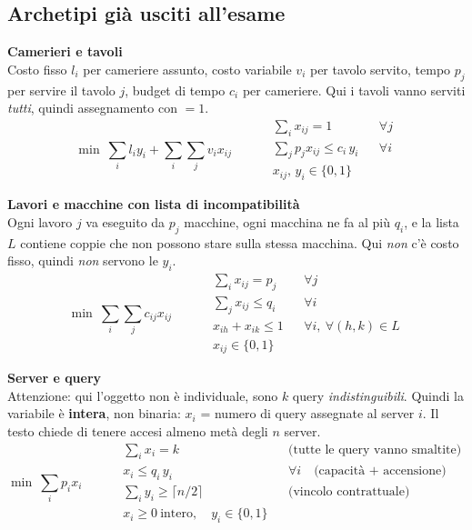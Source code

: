 \documentclass[11pt,a4paper]{article}
\begin{document}
\newpage
\subsection{Archetipi già usciti all'esame}

\textbf{Camerieri e tavoli} \\
Costo fisso $l_i$ per cameriere assunto, costo variabile $v_i$ per tavolo servito, tempo $p_j$
per servire il tavolo $j$, budget di tempo $c_i$ per cameriere. Qui i tavoli vanno serviti
\emph{tutti}, quindi assegnamento con $=1$.
\[
\min \ \sum_i l_i y_i + \sum_i \sum_j v_i x_{ij}
\qquad
\begin{aligned}
&\sum_i x_{ij} = 1 &&\forall j\\
&\sum_j p_j x_{ij} \le c_i\, y_i &&\forall i\\
&x_{ij},\,y_i \in \{0,1\}
\end{aligned}
\]

\textbf{Lavori e macchine con lista di incompatibilità} \\
Ogni lavoro $j$ va eseguito da $p_j$ macchine, ogni macchina ne fa al più $q_i$,
e la lista $L$ contiene coppie che non possono stare sulla stessa macchina.
Qui \emph{non} c'è costo fisso, quindi \emph{non} servono le $y_i$.
\[
\min \ \sum_i \sum_j c_{ij} x_{ij}
\qquad
\begin{aligned}
&\sum_i x_{ij} = p_j &&\forall j\\
&\sum_j x_{ij} \le q_i &&\forall i\\
&x_{ih} + x_{ik} \le 1 &&\forall i,\ \forall (h,k) \in L\\
&x_{ij} \in \{0,1\}
\end{aligned}
\]

\textbf{Server e query} \\
Attenzione: qui l'oggetto non è individuale, sono $k$ query \emph{indistinguibili}.
Quindi la variabile è \textbf{intera}, non binaria: $x_i$ = numero di query assegnate al server $i$.
Il testo chiede di tenere accesi almeno metà degli $n$ server.
\[
\min \ \sum_i p_i x_i
\qquad
\begin{aligned}
&\sum_i x_i = k && \text{(tutte le query vanno smaltite)}\\
&x_i \le q_i\, y_i &&\forall i \quad\text{(capacità + accensione)}\\
&\sum_i y_i \ge \lceil n/2 \rceil && \text{(vincolo contrattuale)}\\
&x_i \ge 0 \ \text{intero},\quad y_i \in \{0,1\}
\end{aligned}
\]
\end{document}
